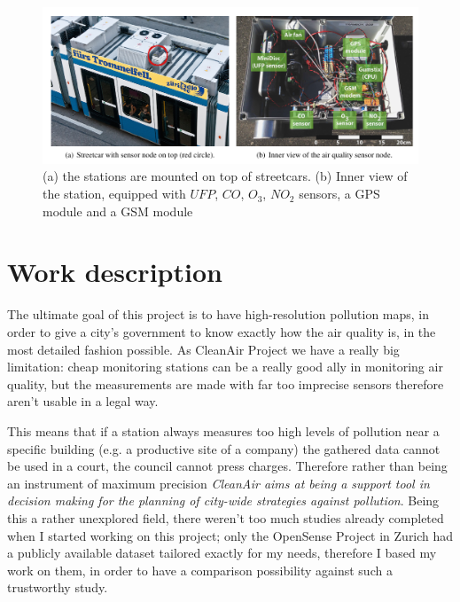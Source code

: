 \documentclass[11pt,a4paper,titlepage]{book}
\begin{document}
\begin{figure}[ht]
    \centering
    \includegraphics[width=\textwidth]{imgs/ch_1/OpenSense_station.png}
    \caption{(a) the stations are mounted on top of streetcars. (b) Inner view of the station, equipped with $UFP$, $CO$, $O_3$, $NO_2$ sensors, a GPS module and a GSM module}
    \label{opensense_station}
\end{figure}


\chapter{Work description}
The ultimate goal of this project is to have high-resolution pollution maps, in order to give a city's government to know exactly how the air quality is, in the most detailed fashion possible.
\newline
\newline
As CleanAir Project we have a really big limitation: cheap monitoring stations can be a really good ally in monitoring air quality, but the measurements are made with far too imprecise sensors therefore aren't usable in a legal way.

This means that if a station always measures too high levels of pollution near a specific building (e.g. a productive site of a company) the gathered data cannot be used in a court, the council cannot press charges. Therefore rather than being an instrument of maximum precision \textit{CleanAir aims at being a support tool in decision making for the planning of city-wide strategies against pollution}. 
\newline
\newline
Being this a rather unexplored field, there weren't too much studies already completed when I started working on this project; only the OpenSense Project in Zurich had a publicly available dataset tailored exactly for my needs, therefore I based my work on them, in order to have a comparison possibility against such a trustworthy study.
\end{document}
